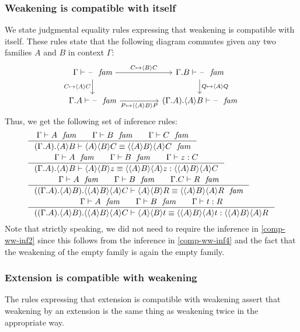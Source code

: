 \subsubsection{Weakening is compatible with itself}\label{comp-ww}
We state judgmental equality rules expressing
that weakening is compatible with itself. These rules state that the following
diagram commutes given any two families $A$ and $B$ in context $\Gamma$:
\begin{equation*}
\begin{tikzcd}[column sep=huge]
\jfam{\Gamma}{\blank} \ar{r}{C\mapsto\ctxwk{B}{C}} \ar{d}[swap]{C\mapsto\ctxwk{A}{C}} & \jfam{\ctxext{\Gamma}{B}}{\blank} \ar{d}{Q\mapsto\ctxwk{A}{Q}}\\
\jfam{\ctxext{\Gamma}{A}}{\blank} \ar{r}[swap]{P\mapsto\ctxwk{{A}{B}}{P}} & \jfam{\ctxext{{\Gamma}{A}}{\ctxwk{A}{B}}}{\blank}
\end{tikzcd}
\end{equation*}
Thus, we get the following set of inference rules:
\begin{align}
& \inference{\jfam{\Gamma}{A}\qquad\jfam{\Gamma}{B}\qquad\jfam{\Gamma}{C}}
          {\jfameq{\ctxext{{\Gamma}{A}}{\ctxwk{A}{B}}}{\ctxwk{A}{{B}{C}}}
            {\ctxwk{{A}{B}}{{A}{C}}}}\\
& \inference{\jfam{\Gamma}{A}\qquad\jfam{\Gamma}{B}\qquad\jterm{\Gamma}{C}{z}}
          {\jtermeq{\ctxext{{\Gamma}{A}}{\ctxwk{A}{B}}}{\ctxwk{{A}{B}}{{A}{C}}}
            {\ctxwk{A}{{B}{z}}}
            {\ctxwk{{A}{B}}{{A}{z}}}}\label{comp-ww-inf2}\\
& \inference{\jfam{\Gamma}{A}\qquad\jfam{\Gamma}{B}\qquad\jfam{\ctxext{\Gamma}{C}}{R}}
          {\jfameq{\ctxext{{{\Gamma}{A}}{\ctxwk{A}{B}}}{\ctxwk{{A}{B}}{{A}{C}}}}
            {\ctxwk{A}{{B}{R}}}
            {\ctxwk{{A}{B}}{{A}{R}}}}\\
& \inference{\jfam{\Gamma}{A}\qquad\jfam{\Gamma}{B}\qquad\jterm{\Gamma}{R}{t}}
          {\jtermeq{\ctxext{{{\Gamma}{A}}{\ctxwk{A}{B}}}{\ctxwk{{A}{B}}{{A}{C}}}}
            {\ctxwk{{A}{B}}{{A}{R}}}{\ctxwk{A}{{B}{t}}}{\ctxwk{{A}{B}}{{A}{t}}}}
            \label{comp-ww-inf4}
\end{align}
Note that strictly speaking, we did not need to require the inference in
\autoref{comp-ww-inf2} since this follows from the inference in \autoref{comp-ww-inf4}
and the fact that the weakening of the empty family is again the empty family.

\subsubsection{Extension is compatible with weakening}\label{comp-ew}
The rules expressing that extension is compatible with weakening assert that
weakening by an extension is the same thing as weakening twice in the
appropriate way.

